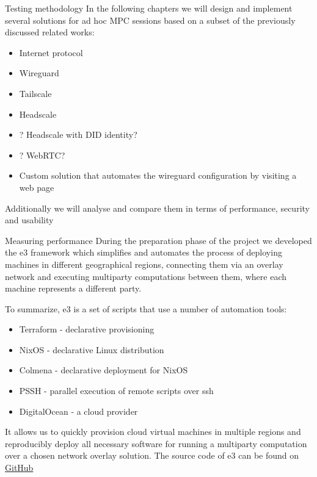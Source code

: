 \begin{frame}{Testing methodology}
\protect\hypertarget{testing-methodology}{}
In the following chapters we will design and implement several solutions
for ad hoc MPC sessions based on a subset of the previously discussed
related works:

\begin{itemize}
\tightlist
\item
  Internet protocol
\item
  Wireguard
\item
  Tailscale
\item
  Headscale
\item
  ? Headscale with DID identity?
\item
  ? WebRTC?
\item
  Custom solution that automates the wireguard configuration by visiting
  a web page
\end{itemize}

Additionally we will analyse and compare them in terms of performance,
security and usability

\begin{block}{Measuring performance}
\protect\hypertarget{measuring-performance}{}
During the preparation phase of the project we developed the \gls{e3}
framework which simplifies and automates the process of deploying
machines in different geographical regions, connecting them via an
overlay network and executing multiparty computations between them,
where each machine represents a different party.

To summarize, \gls{e3} is a set of scripts that use a number of
automation tools:

\begin{itemize}
\tightlist
\item
  Terraform - declarative provisioning
\item
  NixOS - declarative Linux distribution
\item
  Colmena - declarative deployment for NixOS
\item
  PSSH - parallel execution of remote scripts over ssh
\item
  DigitalOcean - a cloud provider
\end{itemize}

It allows us to quickly provision cloud virtual machines in multiple
regions and reproducibly deploy all necessary software for running a
multiparty computation over a chosen network overlay solution. The
source code of \gls{e3} can be found on
\href{https://github.com/e-nikolov/mpyc}{GitHub}


\end{block}
\end{frame}

